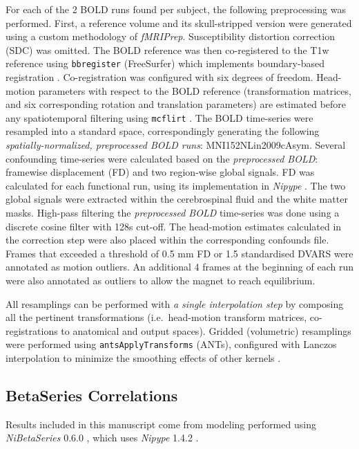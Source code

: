 \documentclass[10pt,letterpaper]{article}
\begin{document}
For each of the 2 BOLD runs found per subject,
the following preprocessing was performed.
First, a reference volume and its skull-stripped version were generated
using a custom methodology of \emph{fMRIPrep}.
Susceptibility distortion correction (SDC) was omitted.
The BOLD reference was then co-registered to the T1w reference using \texttt{bbregister}
(FreeSurfer) which implements boundary-based registration \cite{bbr}.
Co-registration was configured with six degrees of freedom.
Head-motion parameters with respect to the BOLD reference (transformation matrices,
and six corresponding rotation and translation parameters) are estimated before any
spatiotemporal filtering using \texttt{mcflirt} \cite[FSL 5.0.9,]{mcflirt}.
The BOLD time-series were resampled into a standard space, correspondingly
generating the following \emph{spatially-normalized, preprocessed BOLD runs}:
MNI152NLin2009cAsym.
Several confounding time-series were calculated based on the \emph{preprocessed BOLD}:
framewise displacement (FD) and two region-wise global signals.
FD was calculated for each functional run, using its
implementation in \emph{Nipype} \cite[following the definitions
by]{power_fd_dvars}.
The two global signals were extracted within the
cerebrospinal fluid and the white matter masks.
High-pass filtering the \emph{preprocessed BOLD} time-series was done using
a discrete cosine filter with 128s cut-off.
The head-motion estimates calculated in
the correction step were also placed within the corresponding confounds file. 
Frames that exceeded a threshold of 0.5 mm FD or 1.5 standardised DVARS
were annotated as motion outliers.
An additional 4 frames at the beginning of each run were also
annotated as outliers to allow the magnet to reach equilibrium.

All resamplings can be performed with \emph{a single interpolation step} by composing all the pertinent
transformations (i.e.~head-motion transform matrices, co-registrations to anatomical
and output spaces).
Gridded (volumetric) resamplings were performed using \texttt{antsApplyTransforms} (ANTs),
configured with Lanczos interpolation to minimize the smoothing effects of other kernels
\cite{lanczos}.

\subsection*{BetaSeries Correlations}
\label{methods:bsc}

Results included in this manuscript come from modeling performed using
\emph{NiBetaSeries} 0.6.0 \cite{Kent2018}, which uses
\emph{Nipype} 1.4.2 \cite{Gorgolewski2011, Gorgolewski2018}.
\end{document}
